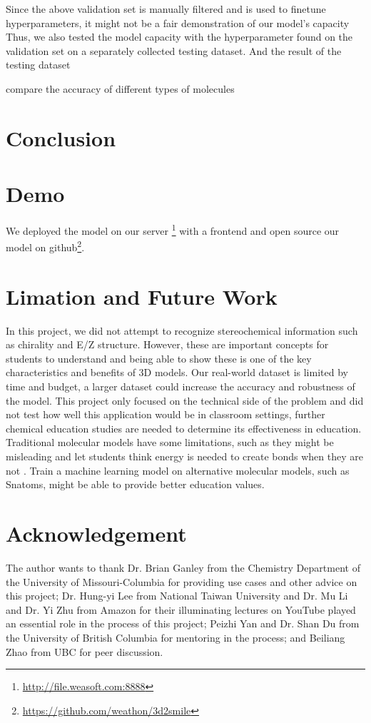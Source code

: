 \documentclass{article}
\begin{document}
Since the above validation set is manually filtered and is used to finetune hyperparameters, it might not be a fair demonstration of our model's capacity Thus, we also tested the model capacity with the hyperparameter found on the validation set on a separately collected testing dataset. And the result of the testing dataset 

compare the accuracy of different types of molecules
\section{Conclusion}
\section{Demo}
We deployed the model on our server \footnote{\url{http://file.weasoft.com:8888}} with a frontend and open source our model on github\footnote{\url{https://github.com/weathon/3d2smile}}. 
\section{Limation and Future Work}
In this project, we did not attempt to recognize stereochemical information such as chirality and E/Z structure. However, these are important concepts for students to understand and being able to show these is one of the key characteristics and benefits of 3D models. 
Our real-world dataset is limited by time and budget, a larger dataset could increase the accuracy and robustness of the model. 
This project only focused on the technical side of the problem and did not test how well this application would be in classroom settings, further chemical education studies are needed to determine its effectiveness in education. 
Traditional molecular models have some limitations, such as they might be misleading and let students think energy is needed to create bonds when they are not \autocite{snatoms}. Train a machine learning model on alternative molecular models, such as Snatoms\autocite{snatoms}, might be able to provide better education values.
\section*{Acknowledgement}
The author wants to thank Dr. Brian Ganley from the Chemistry Department of the University of Missouri-Columbia for providing use cases and other advice on this project; Dr. Hung-yi Lee from National Taiwan University and Dr. Mu Li and Dr. Yi Zhu from Amazon for their illuminating lectures on YouTube played an essential role in the process of this project; Peizhi Yan and Dr. Shan Du from the University of British Columbia for mentoring in the process; and Beiliang Zhao from UBC for peer discussion.
\end{document}
